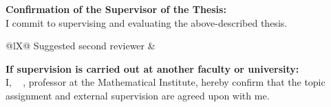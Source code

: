 {\begin{Form}
 \vspace{2ex}
\DatumUnterschrift


\vspace{2ex}  
\textbf{\large Confirmation of the Supervisor of the Thesis:} \\[.5ex]
I commit to supervising and evaluating the above-described thesis.

{\itshape 
\begin{tabularx}{\textwidth}{@{}lX@{}}
Suggested second reviewer & \textfeld{\hsize} \\[.5ex]
\end{tabularx}}

\vspace{2ex}  
\DatumUnterschrift


\vspace{2ex}  
\textbf{\large If supervision is carried out at another faculty or university:} \\[.5ex]
I, \ \textfeld{5.5cm} , professor at the Mathematical Institute,
hereby confirm that the topic assignment and external supervision are agreed upon with me.

\vspace{2ex}  
\DatumUnterschrift

	\end{Form} 
}

\PlaceText{79mm}{263mm}{%
	\Genehmigungsfeld
}
\DateinameDatum

